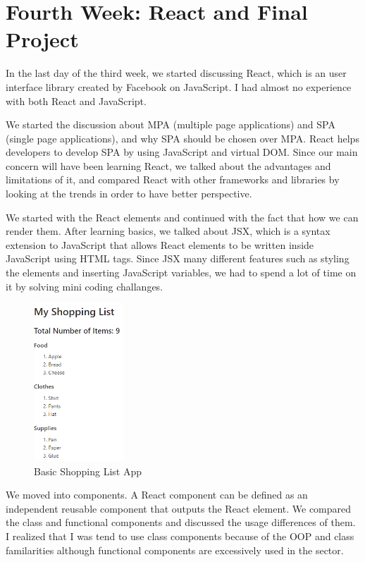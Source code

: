 \section{Fourth Week: React and Final Project}

In the last day of the third week, we started discussing React, which is an user interface library created by Facebook on JavaScript. I had almost no experience with both React and JavaScript. 


We started the discussion about MPA (multiple page applications) and SPA (single page applications), and why SPA should be chosen over MPA. React helps developers to develop SPA by using JavaScript and virtual DOM. Since our main concern will have been learning React, we talked about the advantages and limitations of it, and compared React with other frameworks and libraries by looking at the trends in order to have better perspective.

We started with the React elements and continued with the fact that how we can render them. After learning basics, we talked about JSX, which is a syntax extension to JavaScript that allows React elements to be written inside JavaScript using HTML tags. Since JSX many different features such as styling the elements and inserting JavaScript variables, we had to spend a lot of time on it by solving mini coding challanges.


\begin{figure}
  \centering
  \includegraphics[width=0.3\textwidth]{img/shopping-app.png}
  \caption{Basic Shopping List App}
\end{figure}
We moved into components. A React component can be defined as an independent reusable component that outputs the React element. We compared the class and functional components and discussed the usage differences of them. I realized that I was tend to use class components because of the OOP and class familarities although functional components are excessively used in the sector.

